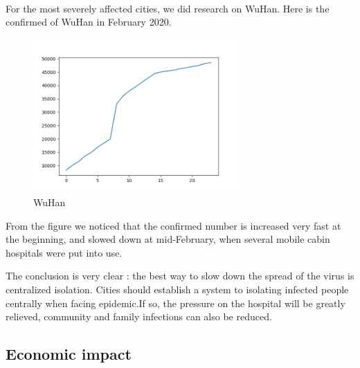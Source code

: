 \documentclass[]{article}
\begin{document}
\paragraph{}
For the most severely affected cities, we did research on WuHan. Here is the confirmed of WuHan in February 2020.
\begin{figure}[H]
	\centering
	\includegraphics[width=0.7\textwidth]{Figure_WuHan.png}
	\caption{WuHan}
\end{figure}
From the figure we noticed that the confirmed number is increased very fast at the beginning, and slowed down at mid-February, 
when several mobile cabin hospitals were put into use.
\par
The conclusion is very clear : the best way to slow down the spread of the virus is centralized isolation. Cities should 
establish a system to isolating infected people centrally when facing epidemic.If so, the pressure on the hospital will be greatly relieved, community and family infections can also be reduced.
\subsection{Economic impact}
\end{document}
